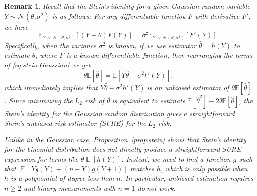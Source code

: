 \documentclass[12pt,letterpaper]{article}
\newcommand{\E}{\operatorname{\mathbb{E}}}
\newtheorem{remark}{Remark}[section]
\begin{document}
\begin{remark}\label{rmk:stein's identity}
Recall that the Stein's identity for a given Gaussian random variable $Y\sim\mathcal{N}(\theta,\sigma^2)$ is as follows: For any differentiable function $F$ with derivative $F'$, we have 
\begin{equation}\label{eq:stein:Gaussian}
\mathbb{E}_{Y\sim\mathcal{N}(\theta,\sigma^2)}[(Y-\theta)F(Y)]=\sigma^2\mathbb{E}_{Y\sim\mathcal{N}(\theta,\sigma^2)}[F'(Y)].
\end{equation}
Specifically, when the variance $\sigma^2$ is known, if we use estimator $\hat{\theta}=h(Y)$ to estimate $\theta$, where $F$ is a known differentiable function, then rearranging the terms of \eqref{eq:stein:Gaussian} we get 
\begin{equation}\label{eq:unbiased:gaussian}
\theta\mathbb{E}[\hat{\theta}]=\mathbb{E}[Y\hat{\theta}-\sigma^2h'(Y)],
\end{equation}
which immediately implies that $Y\hat{\theta}-\sigma^2h'(Y)$ is an unbiased estimator of $\theta\mathbb{E}[\hat{\theta}]$. Since minimizing the $L_2$ risk of $\hat{\theta}$ is equivalent to estimate $\mathbb{E}[\hat{\theta}^2]-2\theta\mathbb{E}[\hat{\theta}]$, the Stein's identity for the Gaussian random distribution gives a straightforward Stein's unbiased risk estimator (SURE) for the $L_2$ risk. 


Unlike in the Gaussian case, Proposition~\ref{prop:stein} shows that Stein’s identity for the binomial distribution does not directly produce a straightforward SURE expression for terms like $\theta \E[h(Y)]$. Instead, we need to find a function $g$ such that $\E[Yg(Y)+ (n-Y)g(Y+1)]$ matches $h$, which is only possible when $h$ is a polynomial of degree less than $n$. In particular, unbiased estimation requires $n \ge 2$ and binary measurements with $n = 1$ do not work.
\end{remark}
\end{document}
